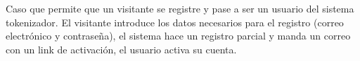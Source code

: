 %
%

{
  Caso que permite que un visitante se registre y pase a ser
  un usuario del sistema tokenizador. El visitante introduce los datos
  necesarios para el registro (correo electrónico y contraseña), el sistema
  hace un registro parcial y manda un correo con un link de activación, el
  usuario activa su cuenta.
}
